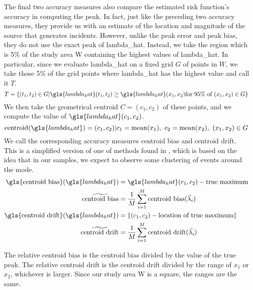 The final two accuracy measures also compare the estimated risk function's accuracy in computing the peak.
In fact,
just like the preceding two accuracy measures,
they provide us with an estimate of the location and magnitude of the source that generates incidents.
However, unlike the \gls{peak error} and \gls{peak bias},
they do not use the exact peak of \gls{lambda_hat}.
Instead,
we take the region which is 5\% of the study area \gls{W} containing the highest values of \gls{lambda_hat}.
In particular,
since we evaluate \gls{lambda_hat} on a fixed grid $G$ of points in $W$,
we take those 5\% of the grid points where \gls{lambda_hat} has the highest value and call it $T$.
\begin{equation}
    T = \left\{ (t_1, t_2) \in G | \gls{lambda_hat}(t_1, t_2)%
        \geq \gls{lambda_hat}\xvec \text{for 95\% of}~\xvec \in G \right\}%
\end{equation}
We then take the geometrical centroid $C=(c_1,c_2)$ of these points,
and we compute the value of $\gls{lambda_hat}(c_1,c_2)$.
\begin{equation}
    \mbox{centroid}(\gls{lambda_hat}) 
        = (c_1, c_2) | c_1 = \mbox{mean}(x_1),~c_2 = \mbox{mean}(x_2),~(x_1, x_2) \in G \\%
\end{equation}
We call the corresponding accuracy measures \gls{centroid bias} and \gls{centroid drift}.
This is a simplified version of one of methods found in \citet{dalenius1965mode},
which is based on the idea that in our samples,
we expect to observe some clustering of events around the mode.
\begin{align}
    \mbox{\gls{centroid bias}}(\gls{lambda_hat})%
        & = \gls{lambda_hat}(c_1, c_2) - \mbox{true maximum} \\%
    \widetilde{\mbox{centroid bias}}%
        & = \frac{1}{M} \sum_{i=1}^{M} \mbox{centroid bias}(\hat{\lambda_i}) \\%
    \mbox{\gls{centroid drift}}(\gls{lambda_hat})%
        & = \norm{(c_1, c_2) - \mbox{location of true maximum}} \\%
    \widetilde{\mbox{centroid drift}}%
        & = \frac{1}{M} \sum_{i=1}^{M} \mbox{centroid drift}(\hat{\lambda_i})%
\end{align}

The \gls{relative centroid bias} is the \gls{centroid bias} divided by the value of the true peak.
The \gls{relative centroid drift} is the \gls{centroid drift} divided by the range of $x_1$ or $x_2$,
whichever is larger.
Since our study area \gls{W} is a square,
the ranges are the same.


